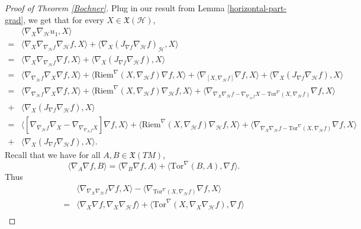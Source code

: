\documentclass[11pt]{article}
\numberwithin{equation}{section}
\newcommand{\Ho}{\mathcal H}
\newcommand{\Tor}{\mathrm{Tor}}
\begin{document}
	
	\begin{proof}[Proof of Theorem \ref{Bochner}]
		
		Plug in our result from Lemma \ref{horizontal-part-grad}, we get that for every $X \in \mathfrak{X}(\Ho)$,
		\begin{align*}
			&\langle \nabla_X \nabla_{\mathcal{H}}u_1 ,X \rangle\\
			=&\langle \nabla_X \nabla_{\nabla_\mathcal{H}f} \nabla_{\mathcal{H}}f, X \rangle+\langle \nabla_X (J_{\nabla f}\nabla_\mathcal{H}f)_{\mathcal{H}}, X \rangle\\
			=&\langle \nabla_X \nabla_{\nabla_\mathcal{H}f} \nabla f, X \rangle+\langle \nabla_X (J_{\nabla f}\nabla_\mathcal{H}f), X \rangle\\
			=&\langle \nabla_{\nabla_\mathcal{H}f} \nabla_X  \nabla f, X \rangle+\langle \mathrm{Riem}^{\nabla}(X, \nabla_{\mathcal{H}} f) \nabla f, X\rangle+{\langle \nabla_{[X, \nabla_\mathcal{H}f]}  \nabla f, X \rangle}+\langle \nabla_X (J_{\nabla f}\nabla_\mathcal{H}f), X \rangle\\
			=&\langle \nabla_{\nabla_\mathcal{H}f} \nabla_X  \nabla f, X \rangle+\langle \mathrm{Riem}^{\nabla}(X, \nabla_{\mathcal{H}} f) \nabla_\Ho f, X\rangle+{\langle \nabla_{\nabla_X \nabla_\mathcal{H}f-\nabla_{\nabla_\mathcal{H}f} X-\mathrm{Tor}^{\nabla}(X, \nabla_\mathcal{H}f) } \nabla f, X \rangle}\\
			+&\langle \nabla_X (J_{\nabla f}\nabla_\mathcal{H}f), X \rangle\\
			=&\langle[\nabla_{\nabla_\mathcal{H}f} \nabla_X-\nabla_{\nabla_{\nabla_\mathcal{H}f} X}] \nabla f, X \rangle+ \langle\mathrm{Riem}^{\nabla}(X, \nabla_{\mathcal{H}} f) \nabla_\Ho f, X\rangle+\langle \nabla_{\nabla_X \nabla_\mathcal{H}f-\Tor^{\nabla}(X, \nabla_\mathcal{H}f) } \nabla f, X \rangle\\
			+&\langle \nabla_X (J_{\nabla f}\nabla_\mathcal{H}f), X \rangle.
		\end{align*}
		Recall that we have for all $A,B\in \mathfrak{X}(TM)$,
		\[ \langle \nabla_A \nabla f, B \rangle=\langle \nabla_B \nabla f, A \rangle+\langle \Tor^\nabla(B,A), \nabla f \rangle.   \]
		Thus
		\begin{align*}
			&\langle \nabla_{\nabla_X \nabla_\mathcal{H}f} \nabla f, X \rangle-\langle \nabla_{\Tor^{\nabla}(X, \nabla_\mathcal{H}f) } \nabla f, X \rangle\\
			=&\langle \nabla_{X} \nabla f, \nabla_X \nabla_\mathcal{H}f  \rangle+\langle \Tor^{\nabla}(X, \nabla_X \nabla_\mathcal{H}f ), \nabla f \rangle\\

\end{align*}
\end{proof}
\end{document}
